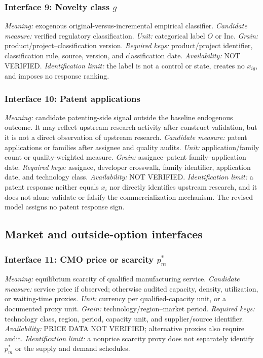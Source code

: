 \subsubsection{Interface 9: Novelty class \texorpdfstring{\(g\)}{novelty class}}
\textit{Meaning:} exogenous original-versus-incremental empirical classifier.
\textit{Candidate measure:} verified regulatory classification.
\textit{Unit:} categorical label \(O\) or \(\mathrm{Inc}\).
\textit{Grain:} product/project--classification version.
\textit{Required keys:} product/project identifier, classification rule,
source, version, and classification date.
\textit{Availability:} NOT VERIFIED.
\textit{Identification limit:} the label is not a control or state, creates no
\(x_{ig}\), and imposes no response ranking.

\subsubsection{Interface 10: Patent applications}
\textit{Meaning:} candidate patenting-side signal outside the baseline
endogenous outcome. It may reflect upstream research activity after construct
validation, but it is not a direct observation of upstream research.
\textit{Candidate measure:} patent applications or families after assignee
and quality audits.
\textit{Unit:} application/family count or quality-weighted measure.
\textit{Grain:} assignee--patent family--application date.
\textit{Required keys:} assignee, developer crosswalk, family identifier,
application date, and technology class.
\textit{Availability:} NOT VERIFIED.
\textit{Identification limit:} a patent response neither equals \(x_i\) nor
directly identifies upstream research, and it does not alone validate or
falsify the commercialization mechanism. The revised model assigns no patent
response sign.

\subsection{Market and outside-option interfaces}
\label{subsec:p10-market-outside}

\subsubsection{Interface 11: CMO price or scarcity \texorpdfstring{\(p_m^*\)}{equilibrium CMO price}}
\textit{Meaning:} equilibrium scarcity of qualified manufacturing service.
\textit{Candidate measure:} service price if observed; otherwise audited
capacity, density, utilization, or waiting-time proxies.
\textit{Unit:} currency per qualified-capacity unit, or a documented proxy
unit.
\textit{Grain:} technology/region--market period.
\textit{Required keys:} technology class, region, period, capacity unit, and
supplier/source identifier.
\textit{Availability:} PRICE DATA NOT VERIFIED; alternative proxies also
require audit.
\textit{Identification limit:} a nonprice scarcity proxy does not separately
identify \(p_m^*\) or the supply and demand schedules.

